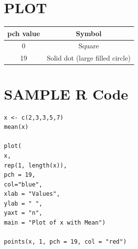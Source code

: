 \documentclass{article}
\begin{document}
\section{PLOT}

\begin{center}
\begin{tabular}{|c|c|}
\hline
\textbf{pch value} & \textbf{Symbol} \\ \hline
0 & Square \\ \hline
19 & Solid dot (large filled circle) \\ \hline
\end{tabular}
\end{center}


\section{SAMPLE R Code}
\begin{verbatim}
x <- c(2,3,3,5,7)
mean(x)

plot(
x, 
rep(1, length(x)), 
pch = 19, 
col="blue",
xlab = "Values", 
ylab = " ", 
yaxt = "n", 
main = "Plot of x with Mean")

points(x, 1, pch = 19, col = "red")

\end{verbatim}
\end{document}
